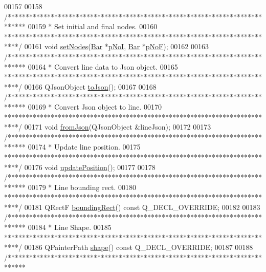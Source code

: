 \begin{DoxyCode}
00157 
00158   \textcolor{comment}{/*****************************************************************************}
00159 \textcolor{comment}{   * Set initial and final nodes.}
00160 \textcolor{comment}{   ****************************************************************************/}
00161   \textcolor{keywordtype}{void} \hyperlink{group___models_gaeeab146e6c1d7d1a688a2764a9c9a170}{setNodes}(\hyperlink{class_bar}{Bar} *\hyperlink{group___models_gaeafd90e84ac2f8de2a879abe9e53eef3}{pNoI}, \hyperlink{class_bar}{Bar} *\hyperlink{group___models_gabbc73ddedd3075c33ae5331bd7c9829f}{pNoF});
00162 
00163   \textcolor{comment}{/*****************************************************************************}
00164 \textcolor{comment}{   * Convert line data to Json object.}
00165 \textcolor{comment}{   ****************************************************************************/}
00166   QJsonObject \hyperlink{group___models_ga4effa7a96db465ea6e01135d5a010739}{toJson}();
00167 
00168   \textcolor{comment}{/*****************************************************************************}
00169 \textcolor{comment}{   * Convert Json object to line.}
00170 \textcolor{comment}{   ****************************************************************************/}
00171   \textcolor{keywordtype}{void} \hyperlink{group___models_ga62623ad71df5279377cc69da90decc75}{fromJson}(QJsonObject &lineJson);
00172 
00173   \textcolor{comment}{/*****************************************************************************}
00174 \textcolor{comment}{   * Update line position.}
00175 \textcolor{comment}{   ****************************************************************************/}
00176   \textcolor{keywordtype}{void} \hyperlink{group___models_ga8fdb12651d4bc592616d241386b066b3}{updatePosition}();
00177 
00178   \textcolor{comment}{/*****************************************************************************}
00179 \textcolor{comment}{   * Line bounding rect.}
00180 \textcolor{comment}{   ****************************************************************************/}
00181   QRectF \hyperlink{group___models_gad15c3af158d3b966c04be7e18cee5aea}{boundingRect}() const Q\_DECL\_OVERRIDE;
00182 
00183   \textcolor{comment}{/*****************************************************************************}
00184 \textcolor{comment}{   * Line Shape.}
00185 \textcolor{comment}{   ****************************************************************************/}
00186   QPainterPath \hyperlink{group___models_gaf1736b829a643d99052ef6428ddd5b16}{shape}() const Q\_DECL\_OVERRIDE;
00187 
00188   \textcolor{comment}{/*****************************************************************************}

\end{DoxyCode}
